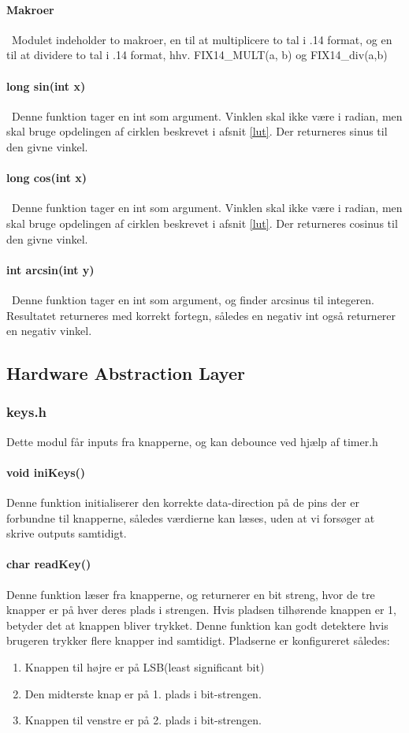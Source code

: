 \paragraph{Makroer}\
Modulet indeholder to makroer, en til at multiplicere to tal i .14 format, og en til at dividere to tal i .14 format, hhv. FIX14\_MULT(a, b) og FIX14\_div(a,b)

\paragraph{long sin(int x)}\
Denne funktion tager en int som argument. Vinklen skal ikke være i radian, men skal bruge opdelingen af cirklen beskrevet i afsnit \ref{lut}. Der returneres sinus til den givne vinkel.
\paragraph{long cos(int x)}\
Denne funktion tager en int som argument. Vinklen skal ikke være i radian, men skal bruge opdelingen af cirklen beskrevet i afsnit \ref{lut}. Der returneres cosinus til den givne vinkel.
\paragraph{int arcsin(int y)}\
Denne funktion tager en int som argument, og finder arcsinus til integeren. Resultatet returneres med korrekt fortegn, således en negativ int også returnerer en negativ vinkel.
\subsection{Hardware Abstraction Layer}
\subsubsection{keys.h}
Dette modul får inputs fra knapperne, og kan debounce ved hjælp af timer.h
\paragraph{void iniKeys()}
Denne funktion initialiserer den korrekte data-direction på de pins der er forbundne til knapperne, således værdierne kan læses, uden at vi forsøger at skrive outputs samtidigt.

\paragraph{char readKey()}
Denne funktion læser fra knapperne, og returnerer en bit streng, hvor de tre knapper er på hver deres plads i strengen. Hvis pladsen tilhørende knappen er 1, betyder det at knappen bliver trykket. Denne funktion kan godt detektere hvis brugeren trykker flere knapper ind samtidigt. Pladserne er konfigureret således:
\begin{enumerate}
\item Knappen til højre er på LSB(least significant bit)
\item Den midterste knap er på 1. plads i bit-strengen.
\item Knappen til venstre er på 2. plads i bit-strengen.
\end{enumerate}

